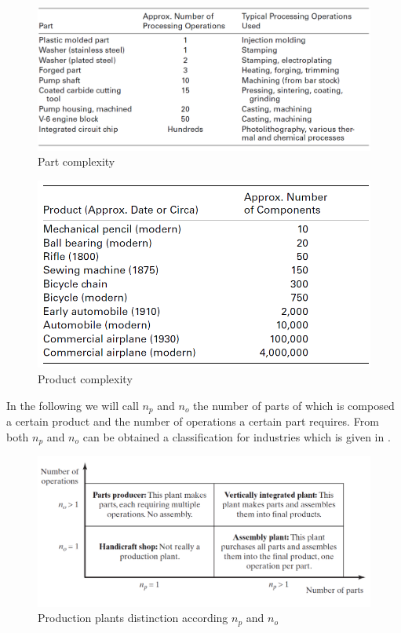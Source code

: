 \begin{figure}
    \centering
    \includegraphics[scale=0.6]{img/part_complexity_table.png}
    \caption{Part complexity}
    \label{fig:part_complexity}
\end{figure}

\begin{figure}
    \centering
    \includegraphics[scale=0.6]{img/prod_complexity_table.png}
    \caption{Product complexity}
    \label{fig:prod_complexity}
\end{figure}

In the following we will call $n_p$ and $n_o$ the number of parts of which is composed a certain product and the number of operations a certain part requires.
From both $n_p$ and $n_o$ can be obtained a classification for industries which is given in .

\begin{figure}
    \centering
    \includegraphics[scale=0.6]{img/np_vs_no.png}
    \caption{Production plants distinction according $n_p$ and $n_o$}
    \label{fig:npno}
\end{figure}

